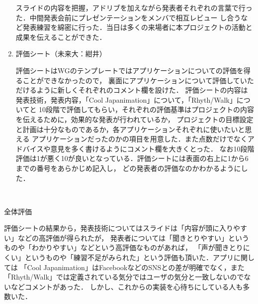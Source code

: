 \begin{enumerate}
スライドの内容を把握，アドリブを加えながら発表者それぞれの言葉で行った．中間発表会前にプレゼンテーションをメンバで相互レビュー
し合うなど発表練習を綿密に行った．当日は多くの来場者に本プロジェクトの活動と成果を伝えることができた．
\item 評価シート（未来大：紺井）
\par
評価シートはWGのテンプレートではアプリケーションについての評価を得ることができなかったので，
裏面にアプリケーションについて評価していただけるように新しくそれぞれのコメント欄を設けた．
評価シートの内容は発表技術，発表内容，「Cool Japanimation」について，「Rhyth/Walk」についてと
10段階で評価してもらい，それぞれの評価基準はプロジェクトの内容を伝えるために，効果的な発表が行われているか，
プロジェクトの目標設定と計画は十分なものであるか，各アプリケーションそれぞれに使いたいと思える
アプリケーションだったのかの項目を用意した．また点数だけでなくアドバイスや意見を多く書けるようにコメント欄を大きくとった．
なお10段階評価は1が悪く10が良いとなっている．評価シートには表面の右上に1から6までの番号をあらかじめ記入し，
どの発表者の評価なのかわかるようにした．
\end{enumerate}　
\par
全体評価
\par
評価シートの結果から，発表技術についてはスライドは「内容が頭に入りやすい」などの高評価が得られたが，
発表者については「聞きとりやすい」というものや「わかりやすい」などという高評価なものがあれば，
「声が聞きとりにくい」というものや「練習不足がみられた」という評価も頂いた．アプリに関しては
「Cool Japanimation」はFacebookなどのSNSとの差が明確でなく，また「Rhyth/Walk」では定義されている気分ではユーザの気分と一致しないのでないなどコメントがあった．
しかし、これからの実装を心待ちにしている人も多数いた．
